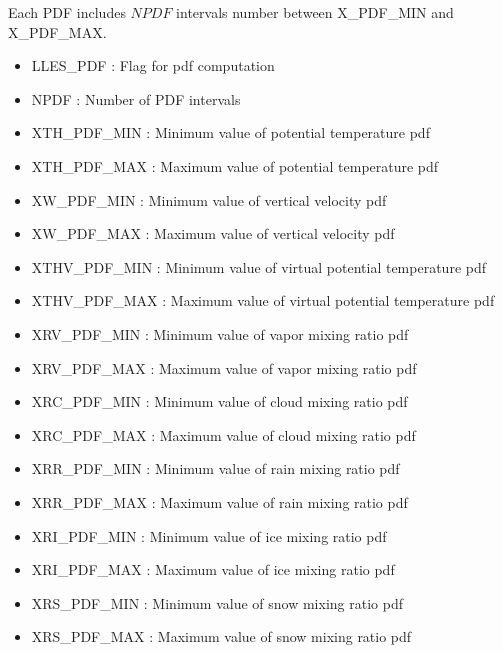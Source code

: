 Each PDF includes $NPDF$ intervals number between X\_PDF\_MIN 
and X\_PDF\_MAX.

\begin{itemize}
\item
LLES\_PDF : Flag for pdf computation 

\item
NPDF : Number of PDF intervals           
 
\item
XTH\_PDF\_MIN : Minimum value of potential temperature pdf

\item
XTH\_PDF\_MAX : Maximum value of potential temperature pdf

\item
XW\_PDF\_MIN : Minimum value of vertical velocity pdf

\item
XW\_PDF\_MAX : Maximum value of vertical velocity pdf

\item
XTHV\_PDF\_MIN : Minimum value of virtual potential temperature pdf

\item
XTHV\_PDF\_MAX : Maximum value of virtual potential temperature pdf

\item
XRV\_PDF\_MIN : Minimum value of vapor mixing ratio pdf

\item
XRV\_PDF\_MAX : Maximum value of vapor mixing ratio pdf

\item
XRC\_PDF\_MIN : Minimum value of cloud mixing ratio pdf

\item
XRC\_PDF\_MAX : Maximum value of cloud mixing ratio pdf

\item
XRR\_PDF\_MIN : Minimum value of rain  mixing ratio pdf

\item
XRR\_PDF\_MAX : Maximum value of rain  mixing ratio pdf

\item
XRI\_PDF\_MIN : Minimum value of ice mixing ratio pdf

\item
XRI\_PDF\_MAX : Maximum value of ice mixing ratio pdf

\item
XRS\_PDF\_MIN : Minimum value of snow  mixing ratio pdf

\item
XRS\_PDF\_MAX : Maximum value of snow mixing ratio pdf


\end{itemize}

